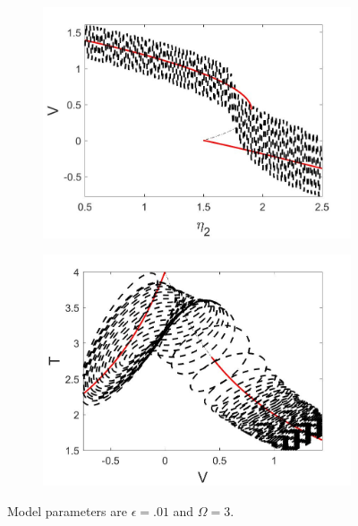 \begin{figure}[H]
\centering
\begin{subfigure}{.5\textwidth}
  \centering
  \includegraphics[width=\linewidth]{conclusion/low_freq_V.jpg}
  \caption{}
\end{subfigure}%
\begin{subfigure}{.5\textwidth}
  \centering
  \includegraphics[width=\linewidth]{conclusion/low_freq_T.jpg}
  \caption{}
\end{subfigure}
\caption{Model parameters are $\epsilon=.01$ and $\Omega=3$.}
\label{fig:low_freq}
\end{figure}